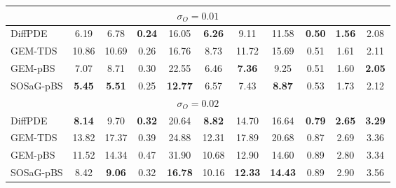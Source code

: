 \begin{table}[ht]
{\begin{tabular}{l cccc | cccccc}
\multicolumn{11}{c}{\textbf{$\sigma_O = 0.01$}} \\
\midrule
DiffPDE  & 6.19          & 6.78          & \textbf{0.24} & 16.05          & \textbf{6.26} & 9.11          & 11.58          & \textbf{0.50} & \textbf{1.56} & 2.08          \\
GEM-TDS & 10.86         & 10.69         & 0.26          & 16.76          & 8.73          & 11.72         & 15.69          & 0.51          & 1.61          & 2.11          \\
GEM-pBS   & 7.07          & 8.71          & 0.30          & 22.55          & 6.46          & \textbf{7.36} & 9.25           & 0.51          & 1.60          & \textbf{2.05} \\
SOSaG-pBS  & \textbf{5.45} & \textbf{5.51} & 0.25          & \textbf{12.77} & 6.57          & 7.43          & \textbf{8.87}  & 0.53          & 1.73          & 2.12          \\
\midrule

\multicolumn{11}{c}{\textbf{$\sigma_O = 0.02$}} \\
\midrule
DiffPDE  & \textbf{8.14} & 9.70          & \textbf{0.32} & 20.64          & \textbf{8.82} & 14.70          & 16.64          & \textbf{0.79} & \textbf{2.65} & \textbf{3.29} \\
GEM-TDS & 13.82         & 17.37         & 0.39          & 24.88          & 12.31         & 17.89          & 20.68          & 0.87          & 2.69          & 3.36          \\
GEM-pBS   & 11.52         & 14.34         & 0.47          & 31.90          & 10.68         & 12.90          & 14.60          & 0.89          & 2.80          & 3.34          \\
SOSaG-pBS  & 8.42          & \textbf{9.06} & 0.32          & \textbf{16.78} & 10.16         & \textbf{12.33} & \textbf{14.43} & 0.89          & 2.90          & 3.56          \\
\bottomrule
\end{tabular}
}
\end{table}


